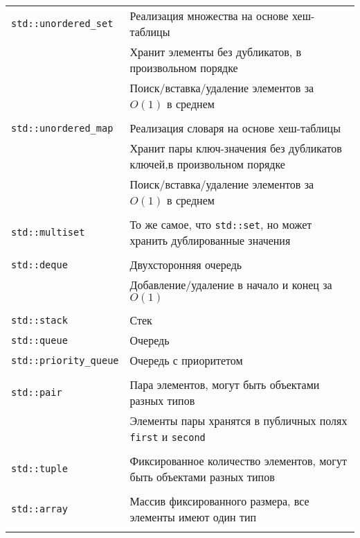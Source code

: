 \documentclass{article}
\begin{document}
\begin{center}
\begin{tabular}{ l | l }
 \texttt{std::unordered\_set} & Реализация множества на основе хеш-таблицы \\
				   & Хранит элементы без дубликатов, в произвольном порядке\\
                   & Поиск/вставка/удаление элементов за $O(1)$ в среднем \\ \\ \hline
 \texttt{std::unordered\_map} & Реализация словаря на основе хеш-таблицы \\
				   & Хранит пары ключ-значения без дубликатов ключей,в произвольном порядке\\
                   & Поиск/вставка/удаление элементов за $O(1)$ в среднем  \\ \\ \hline
 \texttt{std::multiset} & То же самое, что \texttt{std::set}, но может хранить дублированные значения \\ \\ \hline
 \texttt{std::deque} & Двухсторонняя очередь \\
				     & Добавление/удаление в начало и конец за $O(1)$\\ \\  \hline
 \texttt{std::stack} & Стек \\
 \texttt{std::queue} & Очередь \\
 \texttt{std::priority\_queue} & Очередь с приоритетом \\ \\ \hline
 
 \texttt{std::pair} &  Пара элементов, могут быть объектами разных типов \\
                      & Элементы пары хранятся в публичных полях \texttt{first} и \texttt{second} \\ \\ \hline
 \texttt{std::tuple} &  Фиксированное количество элементов, могут быть объектами разных типов \\ \\ \hline
 \texttt{std::array} &  Массив фиксированного размера, все элементы имеют один тип \\ \\ \hline
\end{tabular}
\end{center}


\newpage
\end{document}
